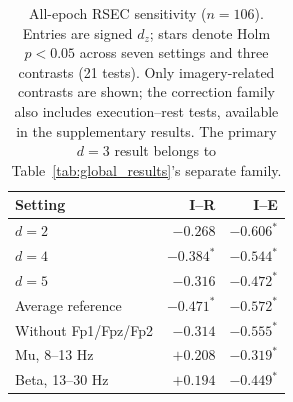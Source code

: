 \begin{table}[!htbp]
\centering
\caption{All-epoch RSEC sensitivity ($n=106$). Entries are signed $d_z$; stars denote Holm $p<0.05$ across seven settings and three contrasts (21 tests). Only imagery-related contrasts are shown; the correction family also includes execution--rest tests, available in the supplementary results. The primary $d=3$ result belongs to Table~\ref{tab:global_results}'s separate family.}
\label{tab:sensitivity}
\small
\setlength{\tabcolsep}{4pt}
\renewcommand{\arraystretch}{1.15}
\begin{tabular}{|l|r|r|}
\hline
\rowcolor{light-gray}
\textbf{Setting} & \textbf{I--R} & \textbf{I--E} \\ \hline
$d=2$ & $-0.268$ & $-0.606^{*}$ \\ \hline
$d=4$ & $-0.384^{*}$ & $-0.544^{*}$ \\ \hline
$d=5$ & $-0.316$ & $-0.472^{*}$ \\ \hline
Average reference & $-0.471^{*}$ & $-0.572^{*}$ \\ \hline
Without Fp1/Fpz/Fp2 & $-0.314$ & $-0.555^{*}$ \\ \hline
Mu, 8--13 Hz & $+0.208$ & $-0.319^{*}$ \\ \hline
Beta, 13--30 Hz & $+0.194$ & $-0.449^{*}$ \\ \hline
\end{tabular}
\end{table}
